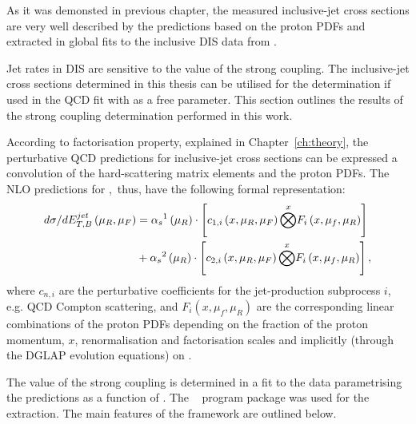 As it was demonsted in previous chapter, the measured inclusive-jet cross sections are very well described by the predictions based on the proton PDFs and \asz extracted in global fits to the inclusive DIS data from \hera. 

Jet rates in DIS are sensitive to the value of the strong coupling. The inclusive-jet cross sections determined in this thesis can be utilised for the \as determination if used in the QCD fit with \as as a free parameter. This section outlines the results of the strong coupling determination performed in this work.

According to factorisation property, explained in Chapter~\ref{ch:theory}, the perturbative QCD predictions for inclusive-jet cross sections can be expressed a convolution of the hard-scattering matrix elements and the proton PDFs. The NLO predictions for \dsdetjetb,~thus, have the following formal representation:
\begin{equation}
	\begin{split}
\mbox{$d\sigma/dE_{T,B}^{jet}$}\left( \mu_R, \mu_F\right) &= \mbox{$\alpha_{s}$}^1\left( \mu_R\right) \cdot \left[ c_{1,i}\left( x, \mu_R, \mu_F\right) \overset{x}{\bigotimes } F_i\left( x, \mu_f, \mu_R \right) \right] \\
&+ \mbox{$\alpha_{s}$}^2\left( \mu_R\right) \cdot \left[ c_{2,i}\left( x, \mu_R, \mu_F\right) \overset{x}{\bigotimes } F_i\left( x, \mu_f, \mu_R \right) \right],
	\end{split}
\end{equation}
where $c_{n,i}$ are the perturbative coefficients for the jet-production subprocess $i$, e.g. QCD Compton scattering, and $F_i\left( x, \mu_f, \mu_R \right)$ are the corresponding linear combinations of the proton PDFs depending on the fraction of the proton momentum, $x$, renormalisation and factorisation scales and implicitly (through the DGLAP evolution equations) on \as.

The value of the strong coupling is determined in a fit to the data parametrising the predictions as a function of \as. The \herafitter~\cite{Aaron:2009aa,Aaron:2009kv} program package was used for the \as extraction. The main features of the \herafitter framework are outlined below.

